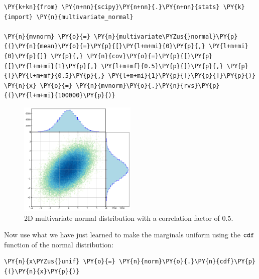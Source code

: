 \begin{tcolorbox}[breakable, size=fbox, boxrule=1pt, pad at break*=1mm,colback=cellbackground, colframe=cellborder]
\begin{Verbatim}[commandchars=\\\{\}]
\PY{k+kn}{from} \PY{n+nn}{scipy}\PY{n+nn}{.}\PY{n+nn}{stats} \PY{k}{import} \PY{n}{multivariate_normal}

\PY{n}{mvnorm} \PY{o}{=} \PY{n}{multivariate\PYZus{}normal}\PY{p}{(}\PY{n}{mean}\PY{o}{=}\PY{p}{[}\PY{l+m+mi}{0}\PY{p}{,} \PY{l+m+mi}{0}\PY{p}{]} \PY{p}{,} \PY{n}{cov}\PY{o}{=}\PY{p}{[}\PY{p}{[}\PY{l+m+mi}{1}\PY{p}{,} \PY{l+m+mf}{0.5}\PY{p}{]}\PY{p}{,} \PY{p}{[}\PY{l+m+mf}{0.5}\PY{p}{,} \PY{l+m+mi}{1}\PY{p}{]}\PY{p}{]}\PY{p}{)}
\PY{n}{x} \PY{o}{=} \PY{n}{mvnorm}\PY{o}{.}\PY{n}{rvs}\PY{p}{(}\PY{l+m+mi}{100000}\PY{p}{)}
\end{Verbatim}
\end{tcolorbox}

\begin{figure}[hb]
  \centering
  \includegraphics[width=0.5\textwidth]{figures/lesson6_14_0.png}
  \caption{2D multivariate normal distribution with a correlation factor of 0.5.}
  \label{fig:multivariate_with_correlation}
\end{figure}
    
Now use what we have just learned to make the marginals uniform using
the \(\tt{cdf}\) function of the normal distribution:

\begin{tcolorbox}[breakable, size=fbox, boxrule=1pt, pad at break*=1mm,colback=cellbackground, colframe=cellborder]
\begin{Verbatim}[commandchars=\\\{\}]
\PY{n}{x\PYZus{}unif} \PY{o}{=} \PY{n}{norm}\PY{o}{.}\PY{n}{cdf}\PY{p}{(}\PY{n}{x}\PY{p}{)}
\end{Verbatim}
\end{tcolorbox}

